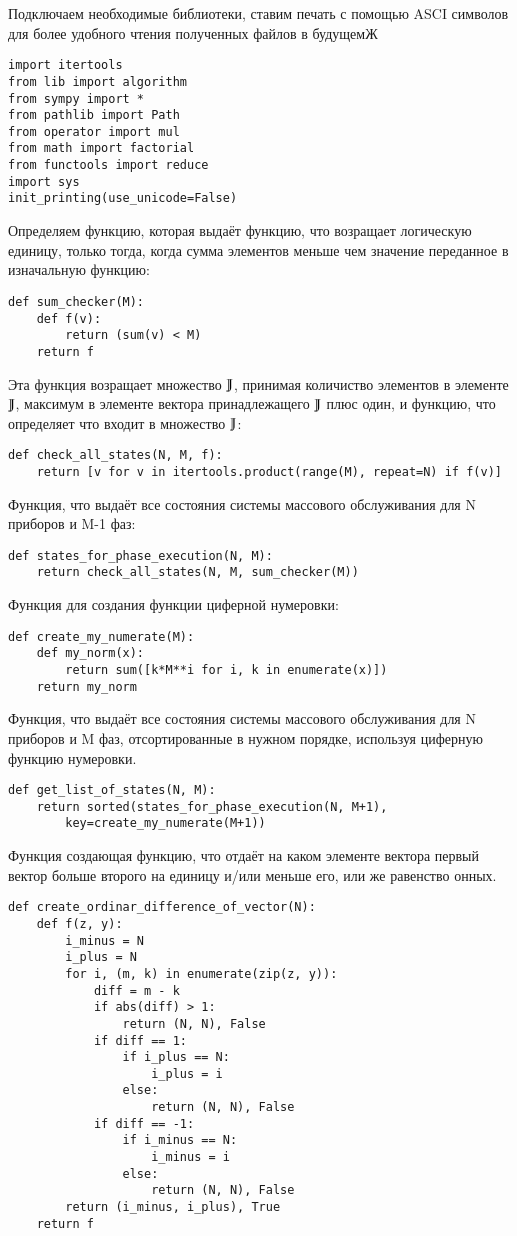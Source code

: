 Подключаем необходимые библиотеки, ставим печать
с помощью ASCI символов для более удобного чтения
полученных файлов в будущемЖ
\begin{verbatim}
import itertools
from lib import algorithm
from sympy import *
from pathlib import Path
from operator import mul
from math import factorial
from functools import reduce
import sys
init_printing(use_unicode=False)
\end{verbatim}

Определяем функцию, которая выдаёт функцию, что
возращает логическую единицу, только тогда, когда
сумма элементов меньше чем значение переданное в изначальную
функцию: 
\begin{verbatim}
def sum_checker(M):
    def f(v):
        return (sum(v) < M)
    return f
\end{verbatim}

Эта функция возращает множество \(\mathbb{J}\), принимая
количиство элементов в элементе \(\mathbb{J}\),
максимум в элементе вектора принадлежащего \(\mathbb{J}\) плюс один,
и функцию, что определяет что входит в множество \(\mathbb{J}\):
\begin{verbatim}
def check_all_states(N, M, f):
    return [v for v in itertools.product(range(M), repeat=N) if f(v)]
\end{verbatim}

Функция, что выдаёт все состояния системы массового обслуживания
для N приборов и M-1 фаз:
\begin{verbatim}
def states_for_phase_execution(N, M):
    return check_all_states(N, M, sum_checker(M))
\end{verbatim}

Функция для создания функции циферной нумеровки:
\begin{verbatim}
def create_my_numerate(M):
    def my_norm(x):
        return sum([k*M**i for i, k in enumerate(x)])
    return my_norm
\end{verbatim}

Функция, что выдаёт все состояния системы массового обслуживания
для N приборов и M фаз, отсортированные в нужном порядке,
используя циферную функцию нумеровки.
\begin{verbatim}
def get_list_of_states(N, M):
    return sorted(states_for_phase_execution(N, M+1),
        key=create_my_numerate(M+1))
\end{verbatim}

Функция создающая функцию, что отдаёт на
каком элементе вектора первый вектор больше второго
на единицу и/или меньше его, или же равенство онных.
\begin{verbatim}
def create_ordinar_difference_of_vector(N):
    def f(z, y):
        i_minus = N
        i_plus = N
        for i, (m, k) in enumerate(zip(z, y)):
            diff = m - k
            if abs(diff) > 1:
                return (N, N), False
            if diff == 1:
                if i_plus == N:
                    i_plus = i
                else:
                    return (N, N), False
            if diff == -1:
                if i_minus == N:
                    i_minus = i
                else:
                    return (N, N), False
        return (i_minus, i_plus), True
    return f
\end{verbatim}

